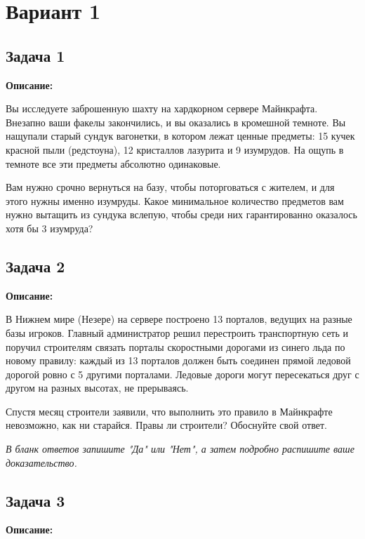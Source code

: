 \documentclass[12pt,a4paper]{article}
\begin{document}
\large

\section{Вариант 1}

\subsection{Задача 1}

\textbf{Описание:}

Вы исследуете заброшенную шахту на хардкорном сервере Майнкрафта. Внезапно ваши факелы закончились, и вы оказались в кромешной темноте. Вы нащупали старый сундук вагонетки, в котором лежат ценные предметы: 15 кучек красной пыли (редстоуна), 12 кристаллов лазурита и 9 изумрудов. На ощупь в темноте все эти предметы абсолютно одинаковые. 

Вам нужно срочно вернуться на базу, чтобы поторговаться с жителем, и для этого нужны именно изумруды. Какое минимальное количество предметов вам нужно вытащить из сундука вслепую, чтобы среди них гарантированно оказалось хотя бы 3 изумруда?

\newpage

\subsection{Задача 2}

\textbf{Описание:}

В Нижнем мире (Незере) на сервере построено 13 порталов, ведущих на разные базы игроков. Главный администратор решил перестроить транспортную сеть и поручил строителям связать порталы скоростными дорогами из синего льда по новому правилу: каждый из 13 порталов должен быть соединен прямой ледовой дорогой ровно с 5 другими порталами. Ледовые дороги могут пересекаться друг с другом на разных высотах, не прерываясь.

Спустя месяц строители заявили, что выполнить это правило в Майнкрафте невозможно, как ни старайся. Правы ли строители? Обоснуйте свой ответ.

\textit{В бланк ответов запишите "Да" или "Нет", а затем подробно распишите ваше доказательство.}

\newpage

\subsection*{Задача 3}

\textbf{Описание:}
\end{document}
